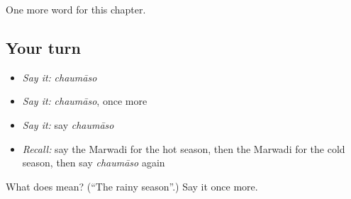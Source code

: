 \begin{grammarlens}[title={What you've built}]
One more word for this chapter.
\end{grammarlens}

\subsection*{Your turn}
\begin{itemize}
\raggedright
  \item \emph{Say it:} \emph{chaumāso}
  \item \emph{Say it:} \emph{chaumāso}, once more
  \item \emph{Say it:} say \emph{chaumāso}
  \item \emph{Recall:} say the Marwadi for the hot season, then the Marwadi for the cold season, then say \emph{chaumāso} again
\end{itemize}

\begin{tcolorbox}[breakable,colback=teal!4,colframe=teal!35!black,title={Before you move on}]
What does  mean? (\textquotedblleft{}The rainy season\textquotedblright{}.) Say it once more.
\end{tcolorbox}
